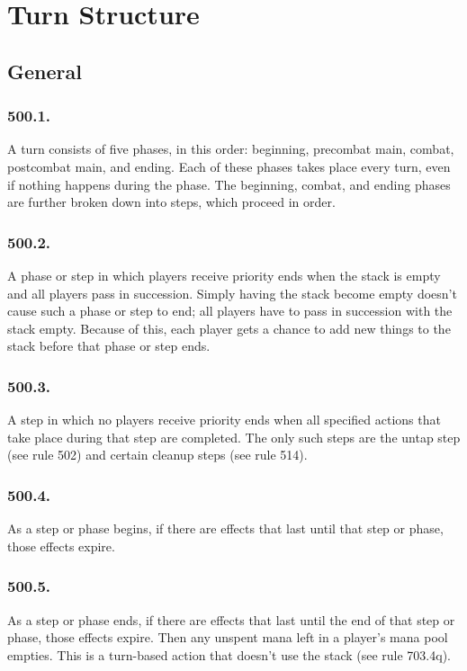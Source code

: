 \chapter{Turn Structure}
\setcounter{section}{499}
\section{General}
\subsection*{500.1.}
A turn consists of five phases, in this order: beginning, precombat main, combat, postcombat main, and ending. Each of these phases takes place every turn, even if nothing happens during the phase. The beginning, combat, and ending phases are further broken down into steps, which proceed in order.

\subsection*{500.2.}
A phase or step in which players receive priority ends when the stack is empty and all players pass in succession. Simply having the stack become empty doesn’t cause such a phase or step to end; all players have to pass in succession with the stack empty. Because of this, each player gets a chance to add new things to the stack before that phase or step ends.

\subsection*{500.3.}
A step in which no players receive priority ends when all specified actions that take place during that step are completed. The only such steps are the untap step (see rule 502) and certain cleanup steps (see rule 514).

\subsection*{500.4.}
As a step or phase begins, if there are effects that last until that step or phase, those effects expire.

\subsection*{500.5.}
As a step or phase ends, if there are effects that last until the end of that step or phase, those effects expire. Then any unspent mana left in a player’s mana pool empties. This is a turn-based action that doesn’t use the stack (see rule 703.4q).

